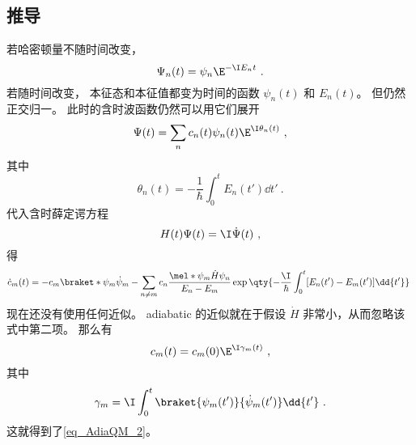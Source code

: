 \subsection{推导}
若哈密顿量不随时间改变，
\begin{equation}
\Psi_n(t) = \psi_n \E^{-\I E_n t}~.
\end{equation}
若随时间改变， 本征态和本征值都变为时间的函数 $\psi_n(t)$ 和 $E_n(t)$。 但仍然正交归一。 此时的含时波函数仍然可以用它们展开
\begin{equation}
\Psi(t) = \sum_n c_n(t) \psi_n(t) \E^{\I \theta_n(t)}~,
\end{equation}
其中
\begin{equation}
\theta_n(t) = -\frac{1}{\hbar} \int_0^t E_n(t')\dd{t'}~.
\end{equation}
代入含时薛定谔方程
\begin{equation}\label{eq_AdiaQM_1}
H(t)\Psi(t) = \I \dot \Psi(t)~,
\end{equation}
得
\begin{equation}
\dot c_m(t) = -c_m \braket*{\psi_m}{\dot\psi_m} - \sum_{n\ne m} c_n \frac{\mel*{\psi_m}{\dot H}{\psi_n}}{E_n-E_m} \exp\qty{{-\frac{\I}{\hbar}\int_0^t[E_n(t')-E_m(t')]\dd{t'}}}~
\end{equation}
现在还没有使用任何近似。 adiabatic 的近似就在于假设 $\dot H$ 非常小，从而忽略该式中第二项。 那么有
\begin{equation}
c_m(t) = c_m(0)\E^{\I\gamma_m(t)}~,
\end{equation}
其中
\begin{equation}
\gamma_m = \I \int_0^t \braket{\psi_m(t')}{\dot\psi_m(t')}\dd{t'}~.
\end{equation}
这就得到了\autoref{eq_AdiaQM_2}。
